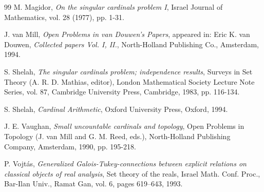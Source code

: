 \documentclass{article}
\begin{document}
\begin{thebibliography}{99}
  M. Magidor, \emph{On the singular cardinals problem I}, Israel Journal of Mathematics, vol. 28 (1977), pp. 1-31.

 J. van Mill, \emph{Open Problems in van Douwen's Papers}, appeared in: Eric K. van Douwen,
\emph{Collected papers Vol. I, II.}, 
North-Holland Publishing Co., Amsterdam, 1994.


 S. Shelah, \emph{The singular cardinals problem; independence results}, Surveys in Set Theory (A. R. D. Mathias, editor), London Mathematical Society Lecture Note Series, vol. 87, Cambridge University
Press, Cambridge, 1983, pp. 116-134.

S. Shelah, \emph{Cardinal Arithmetic}, Oxford University Press, Oxford, 1994.

 J. E. Vaughan, \emph{Small uncountable cardinals and topology}, Open Problems in Topology
(J. van Mill and G. M. Reed, eds.), North-Holland Publishing Company, Amsterdam,
1990, pp. 195-218.

 P. Vojt\'{a}s, \emph{Generalized {G}alois-{T}ukey-connections between explicit relations on classical objects of real analysis}, Set theory of the reals, Israel Math. Conf. Proc., Bar-Ilan Univ., Ramat Gan, vol. 6, pages 619–643, 1993.


\end{thebibliography}
\end{document}
